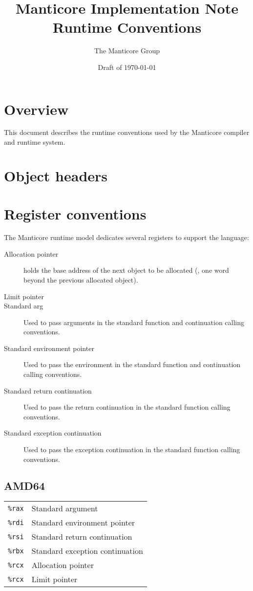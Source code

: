 \documentclass[11pt]{article}
\title{Manticore Implementation Note \\ Runtime Conventions}
\author{The Manticore Group}
\date{Draft of \today}
\begin{document}
\maketitle

\section{Overview}
This document describes the runtime conventions used
by the Manticore compiler and runtime system.

\section{Object headers}

\section{Register conventions}
The Manticore runtime model dedicates several registers to
support the language:
\begin{description}
  \item[Allocation pointer]
    holds the base address of the next object to be
    allocated (\ie{}, one word beyond the previous allocated
    object).
  \item[Limit pointer]
  \item[Standard arg]
    Used to pass arguments in the standard function and continuation
    calling conventions.
  \item[Standard environment pointer]
    Used to pass the environment in the standard function and continuation
    calling conventions.
  \item[Standard return continuation]
    Used to pass the return continuation in the standard function
    calling conventions.
  \item[Standard exception continuation]
    Used to pass the exception continuation in the standard function
    calling conventions.
\end{description}%

\subsection{AMD64}
\begin{center}
  \begin{tabular}{cl}
    \texttt{\%rax} & Standard argument \\
    \texttt{\%rdi} & Standard environment pointer \\
    \texttt{\%rsi} & Standard return continuation \\
    \texttt{\%rbx} & Standard exception continuation \\
    \texttt{\%rcx} & Allocation pointer \\
    \texttt{\%rcx} & Limit pointer
  \end{tabular}%
\end{center}%
\end{document}
